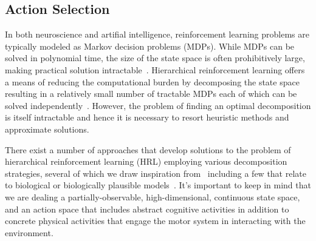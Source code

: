 \documentclass[letterpaper,11pt]{article}
\begin{document}

\subsection{Action Selection}
\label{subsection_action_selection}






In both neuroscience and artifial intelligence, reinforcement learning problems are typically modeled as Markov decision problems (MDPs). While MDPs can be solved in polynomial time, the size of the state space is often prohibitively large, making practical solution intractable~\cite{LittmanetalUAI-95}. Hierarchical reinforcement learning offers a means of reducing the computational burden by decomposing the state space resulting in a relatively small number of tractable MDPs each of which can be solved independently~\cite{KaelblingICML-93,DietterichJAIR-00,HengstEMLDM-17}. However, the problem of finding an optimal decomposition is itself intractable and hence it is necessary to resort heuristic methods and approximate solutions.

There exist a number of approaches that develop solutions to the problem of hierarchical reinforcement learning (HRL) employing various decomposition strategies, several of which we draw inspiration from~\cite{NarasimhanetalJAIR-18,AndreasetalICML-17,SahnietalCoRR-17,KulkarnietalNIPS-16,BakkerandSchmidhuberIAS-04,MoffaertandNoweJMLR-14,PashevichetalCoRR-18} including a few that relate to biological or biologically plausible models~\cite{RasmussenetalPLoS-ONE-17,DiuketalCRMHOB-13,FrankandBadreCEREBRAL-CORTEX-12,RibasFernandesNEURON-11}. It's important to keep in mind that we are dealing a partially-observable, high-dimensional, continuous state space, and an action space that includes abstract cognitive activities in addition to concrete physical activities that engage the motor system in interacting with the environment. 
\end{document}
